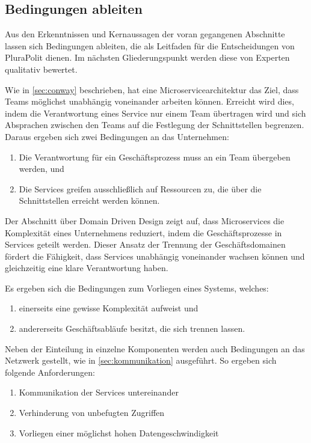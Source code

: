 \subsection{Bedingungen ableiten}
\label{sec:bedingungen}

Aus den Erkenntnissen und Kernaussagen der voran gegangenen Abschnitte lassen sich Bedingungen ableiten, die als Leitfaden für die Entscheidungen von PluraPolit dienen. Im nächsten Gliederungspunkt werden diese von Experten qualitativ bewertet.

Wie in \cref{sec:conway} beschrieben, hat eine Microservicearchitektur das Ziel, dass Teams möglichst unabhängig voneinander arbeiten können. Erreicht wird dies, indem die Verantwortung eines Service nur einem Team übertragen wird und sich Absprachen zwischen den Teams auf die Festlegung der Schnittstellen begrenzen. Daraus ergeben sich zwei Bedingungen an das Unternehmen:
\begin{enumerate}
	\item Die Verantwortung für ein Geschäftsprozess muss an ein Team übergeben werden, und
	\item Die Services greifen ausschließlich auf Ressourcen zu, die über die Schnittstellen erreicht werden können.
\end{enumerate}

Der Abschnitt über Domain Driven Design zeigt auf, dass Microservices die Komplexität eines Unternehmens reduziert, indem die Geschäftsprozesse in Services geteilt werden. Dieser Ansatz der Trennung der Geschäftsdomainen fördert die Fähigkeit, dass Services unabhängig voneinander wachsen können und gleichzeitig eine klare Verantwortung haben.

Es ergeben sich die Bedingungen zum Vorliegen eines Systems, welches:
\begin{enumerate}
	\item einerseits eine gewisse Komplexität aufweist und
	\item andererseits Geschäftsabläufe besitzt, die sich trennen lassen.
\end{enumerate}

Neben der Einteilung in einzelne Komponenten werden auch Bedingungen an das Netzwerk gestellt, wie in \cref{sec:kommunikation} ausgeführt. So ergeben sich folgende Anforderungen:
\begin{enumerate}
	\item Kommunikation der Services untereinander
	\item Verhinderung von unbefugten Zugriffen
	\item Vorliegen einer möglichst hohen Datengeschwindigkeit
\end{enumerate}

